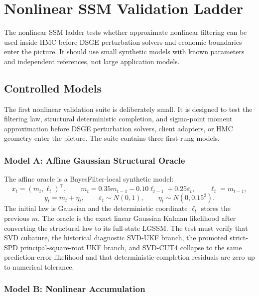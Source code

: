 \chapter{Nonlinear SSM Validation Ladder}
\label{ch:bf-nonlinear-ssm-validation}

The nonlinear SSM ladder tests whether approximate nonlinear filtering can be
used inside HMC before DSGE perturbation solvers and economic boundaries enter
the picture.  It should use small synthetic models with known parameters and
independent references, not large application models.

\section{Controlled Models}
\label{sec:bf-nonlinear-controlled-models}

The first nonlinear validation suite is deliberately small.  It is designed to
test the filtering law, structural deterministic completion, and sigma-point
moment approximation before DSGE perturbation solvers, client adapters, or HMC
geometry enter the picture.  The suite contains three first-rung models.

\subsection{Model A: Affine Gaussian Structural Oracle}
\label{subsec:bf-nonlinear-model-a}

The affine oracle is a BayesFilter-local synthetic model:
\[
  x_t=(m_t,\ell_t)^\top,\qquad
  m_t=0.35m_{t-1}-0.10\ell_{t-1}+0.25\varepsilon_t,\qquad
  \ell_t=m_{t-1},
\]
\[
  y_t=m_t+\eta_t,\qquad
  \varepsilon_t\sim N(0,1),\qquad
  \eta_t\sim N(0,0.15^2).
\]
The initial law is Gaussian and the deterministic coordinate \(\ell_t\)
stores the previous \(m\).  The oracle is the exact linear Gaussian Kalman
likelihood after converting the structural law to its full-state LGSSM.  The
test must verify that SVD cubature, the historical diagnostic SVD-UKF branch,
the promoted strict-SPD principal-square-root UKF branch, and SVD-CUT4 collapse
to the same prediction-error likelihood and that deterministic-completion
residuals are zero up to numerical tolerance.

\subsection{Model B: Nonlinear Accumulation}
\label{subsec:bf-nonlinear-model-b}

